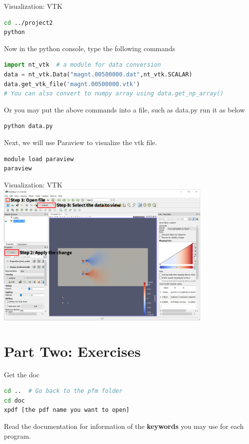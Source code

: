 \documentclass[11pt,aspectratio=169]{beamer}
\begin{document}
\begin{frame}[fragile]{Visualization: VTK}
\begin{lstlisting}[language=bash]
cd ../project2
python
\end{lstlisting}
Now in the python console, type the following commands
\begin{lstlisting}[language=python]
import nt_vtk  # a module for data conversion
data = nt_vtk.Data("magnt.00500000.dat",nt_vtk.SCALAR)
data.get_vtk_file('magnt.00500000.vtk')
# You can also convert to numpy array using data.get_np_array()
\end{lstlisting}
Or you may put the above commands into a file, such as data.py run it as below\\
\begin{lstlisting}[language=bash]
python data.py
\end{lstlisting}
Next, we will use Paraview to visualize the vtk file.
\begin{lstlisting}[language=bash]
module load paraview
paraview
\end{lstlisting}
\end{frame}

\begin{frame}{Visualization: VTK}
\centering
\includegraphics[width=0.8\textwidth]{img/Scalar.png}
\end{frame}

\section[Part Two: Exercises]{Part Two: Exercises}
\begin{frame}[fragile]{Get the doc}
\begin{lstlisting}[language=bash]
cd ..  # Go back to the pfm folder
cd doc
xpdf [the pdf name you want to open]
\end{lstlisting}
Read the documentation for information of the {\bf keywords} you may use for each program.
\end{frame}
\end{document}
